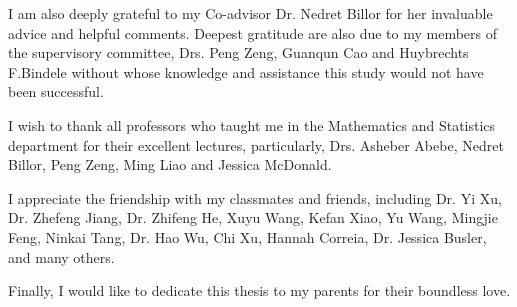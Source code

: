 \begin{romanpages}
\begin{acknowledgments}
I am also deeply grateful to my Co-advisor Dr. Nedret Billor for her invaluable advice and helpful comments. Deepest gratitude are also due to my members of the supervisory committee, Drs. Peng Zeng, Guanqun Cao and Huybrechts F.Bindele without whose knowledge and assistance this study would not have been successful.

I wish to thank all professors who taught me in the Mathematics and Statistics department for their excellent lectures, particularly, Drs. Asheber Abebe, Nedret Billor, Peng Zeng, Ming Liao and Jessica McDonald.

I appreciate the friendship with my classmates and friends, including Dr. Yi Xu, Dr. Zhefeng Jiang, Dr. Zhifeng He, Xuyu Wang, Kefan Xiao, Yu Wang, Mingjie Feng, Ninkai Tang, Dr. Hao Wu, Chi Xu, Hannah Correia, Dr. Jessica Busler, and many others. 

Finally, I would like to dedicate this thesis to my parents for their boundless love.
\end{acknowledgments}

\begin{singlespace}
	\tableofcontents
	\clearpage
	\listoffigures
	\clearpage
	\listoftables
\end{singlespace}

\end{romanpages}        %

\normalem       %

\doublespacing

